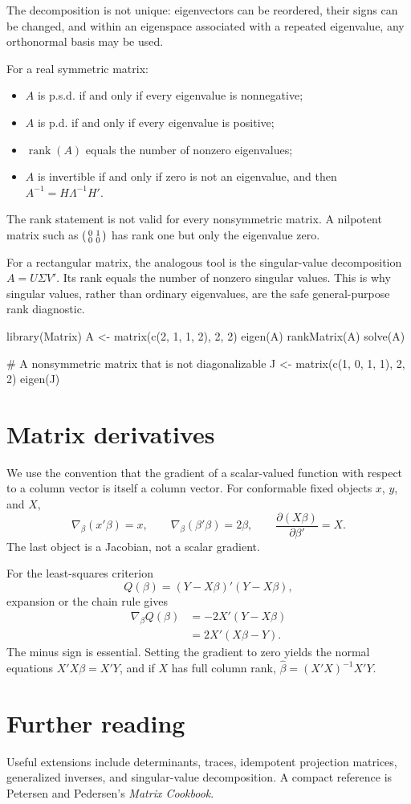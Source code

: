The decomposition is not unique: eigenvectors can be reordered, their signs
can be changed, and within an eigenspace associated with a repeated
eigenvalue, any orthonormal basis may be used.

For a real symmetric matrix:
\begin{itemize}
  \item $A$ is p.s.d. if and only if every eigenvalue is nonnegative;
  \item $A$ is p.d. if and only if every eigenvalue is positive;
  \item $\operatorname{rank}(A)$ equals the number of nonzero eigenvalues;
  \item $A$ is invertible if and only if zero is not an eigenvalue, and then
        $A^{-1}=H\Lambda^{-1}H'$.
\end{itemize}
The rank statement is not valid for every nonsymmetric matrix.  A nilpotent
matrix such as $\begin{psmallmatrix}0&1\\0&0\end{psmallmatrix}$ has rank one
but only the eigenvalue zero.

For a rectangular matrix, the analogous tool is the singular-value
decomposition $A=U\Sigma V'$.  Its rank equals the number of nonzero singular
values.  This is why singular values, rather than ordinary eigenvalues, are
the safe general-purpose rank diagnostic.

\begin{rcode}
library(Matrix)
A <- matrix(c(2, 1, 1, 2), 2, 2)
eigen(A)
rankMatrix(A)
solve(A)

# A nonsymmetric matrix that is not diagonalizable
J <- matrix(c(1, 0, 1, 1), 2, 2)
eigen(J)
\end{rcode}

\section{Matrix derivatives}

We use the convention that the gradient of a scalar-valued function with
respect to a column vector is itself a column vector.  For conformable fixed
objects $x$, $y$, and $X$,
\[
  \nabla_\beta(x'\beta)=x,
  \qquad
  \nabla_\beta(\beta'\beta)=2\beta,
  \qquad
  \frac{\partial(X\beta)}{\partial\beta'}=X.
\]
The last object is a Jacobian, not a scalar gradient.

For the least-squares criterion
\[
  Q(\beta)=(Y-X\beta)'(Y-X\beta),
\]
expansion or the chain rule gives
\begin{align*}
  \nabla_\beta Q(\beta)
  &=-2X'(Y-X\beta)\\
  &=2X'(X\beta-Y).
\end{align*}
The minus sign is essential.  Setting the gradient to zero yields the normal
equations $X'X\beta=X'Y$, and if $X$ has full column rank,
$\widehat\beta=(X'X)^{-1}X'Y$.

\section{Further reading}

Useful extensions include determinants, traces, idempotent projection
matrices, generalized inverses, and singular-value decomposition.  A compact
reference is Petersen and Pedersen's \emph{Matrix Cookbook}.
